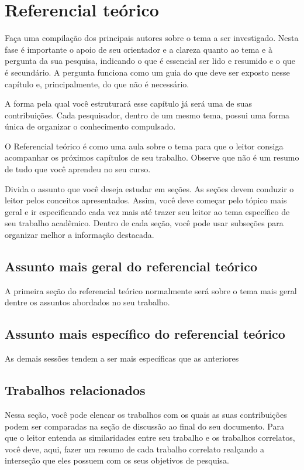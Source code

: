 \chapter{Referencial teórico}
\label{cap:referencial_teorico}

Faça uma compilação dos principais autores sobre o tema a ser investigado. Nesta fase é importante o apoio de seu orientador e a clareza quanto ao tema e à pergunta da sua pesquisa, indicando o que é essencial ser lido e resumido e o que é secundário. A pergunta funciona como um guia do que deve ser exposto nesse capítulo e, principalmente, do que não é necessário.

A forma pela qual você estruturará esse capítulo já será uma de suas contribuições. Cada pesquisador, dentro de um mesmo tema, possui uma forma única de organizar o conhecimento compulsado. 

O Referencial teórico é como uma aula sobre o tema para que o leitor consiga acompanhar os próximos capítulos de seu trabalho. Observe que não é um resumo de tudo que você aprendeu no seu curso.

Divida o assunto que você deseja estudar em seções. As seções devem conduzir o leitor pelos conceitos apresentados. Assim, você deve começar pelo tópico mais geral e ir especificando cada vez mais até trazer seu leitor ao tema específico de seu trabalho acadêmico. Dentro de cada seção, você pode usar subseções para organizar melhor a informação destacada.

\section{Assunto mais geral do referencial teórico} \label{sub:assunto2}

A primeira seção do referencial teórico normalmente será sobre o tema mais geral dentre os assuntos abordados no seu trabalho. 

\section{Assunto mais específico do referencial teórico}

As demais sessões tendem a ser mais específicas que as anteriores

\section{Trabalhos relacionados}

Nessa seção, você pode elencar os trabalhos com os quais as suas contribuições podem ser comparadas na seção de discussão ao final do seu documento.
Para que o leitor entenda as similaridades entre seu trabalho e os trabalhos correlatos, você deve, aqui, fazer um resumo de cada trabalho correlato realçando a interseção que eles possuem com os seus objetivos de pesquisa.

